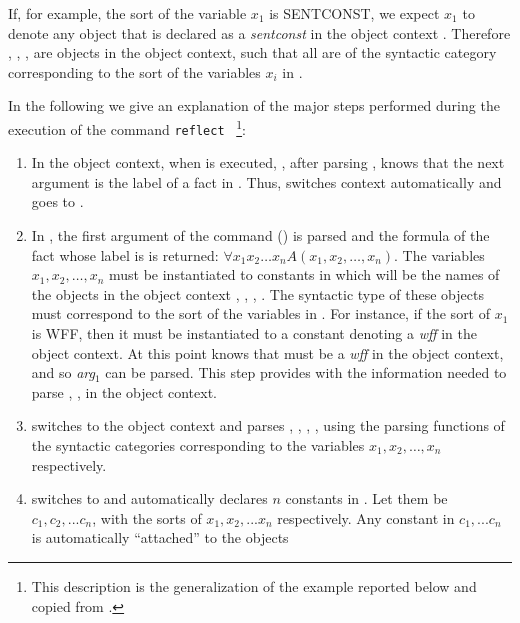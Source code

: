 {   If, for example,  the sort of the variable $x_1$  is SENTCONST,  we
   expect $x_1$ to denote any object that is declared  as  a {\em sentconst}
   in the object  context .  Therefore , , \SEQ, 
   are objects in the object context, such that all  are of
   the syntactic category corresponding to the sort of the variables $x_i$
   in .

   In the following we give an explanation of the major steps performed during
   the execution of the command {\tt reflect} \cite{giunchiglia3}~\footnote{
   This description is the generalization of the example reported below
   and copied from \cite{giunchiglia3}.}:

   \begin{enumerate}
   \item 
     In the object context, when  is executed, {\GF}, after parsing 
     , knows that the next argument is the label of a fact in 
     {\meta}. 
     Thus, {\GF} switches context automatically and goes to {\meta}.
   \item
     In {\meta}, the first argument of the command () is parsed 
     and the formula of the fact whose label is  is returned:
     $\forall x_1 x_2\ldots x_n A(x_1, x_2,\ldots,x_n)$.
     The variables $x_1, x_2,\ldots,x_n$ must be instantiated to constants
     in {\meta} which will be the names of the objects in the object context
     , , \SEQ, .
     The syntactic type of these objects must correspond to the sort of the 
     variables in {\meta}.
     For instance, if the sort of $x_1$ is WFF, then it must be instantiated
     to a constant denoting a {\it wff} in the object context. At this point
     {\GF} knows that  must be a {\it wff} in the object context,
     and so {\em arg}$_1$ can be parsed.
     This step provides {\GF} with the information needed to parse ,
     \SEQ,  in the object context.
   \item 
     {\GF} switches to the object context and parses  , , 
     \SEQ, , using the parsing functions of the syntactic categories
     corresponding to the variables $x_1, x_2,\ldots,x_n$ respectively.
   \item 
     {\GF} switches to {\meta} and automatically declares $n$ constants in 
     {\meta}. Let them be $c_1, c_2, ... c_n$, with the sorts of $x_1, x_2, 
     ... x_n$ respectively.
     Any constant in $c_1, ... c_n$ is automatically ``attached'' to the objects

\end{enumerate}}
